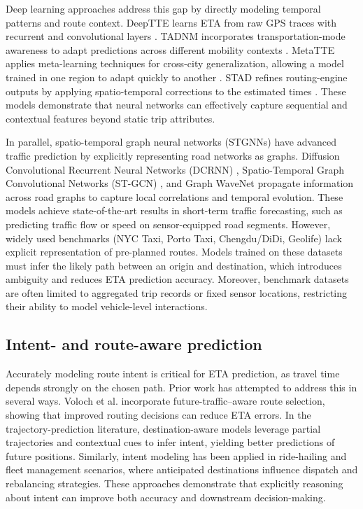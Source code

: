 Deep learning approaches address this gap by directly modeling temporal patterns and route context. DeepTTE learns ETA from raw GPS traces with recurrent and convolutional layers \cite{wang2018deeptte}. TADNM incorporates transportation-mode awareness to adapt predictions across different mobility contexts \cite{xu2020tadnm}. MetaTTE applies meta-learning techniques for cross-city generalization, allowing a model trained in one region to adapt quickly to another \cite{wang2022metatte}. STAD refines routing-engine outputs by applying spatio-temporal corrections to the estimated times \cite{abbar2020stad}. These models demonstrate that neural networks can effectively capture sequential and contextual features beyond static trip attributes.

In parallel, spatio-temporal graph neural networks (STGNNs) have advanced traffic prediction by explicitly representing road networks as graphs. Diffusion Convolutional Recurrent Neural Networks (DCRNN) \cite{li2018dcrnn}, Spatio-Temporal Graph Convolutional Networks (ST-GCN) \cite{yu2018stgcn}, and Graph WaveNet \cite{wu2019graphwavenet} propagate information across road graphs to capture local correlations and temporal evolution. These models achieve state-of-the-art results in short-term traffic forecasting, such as predicting traffic flow or speed on sensor-equipped road segments. However, widely used benchmarks (NYC Taxi, Porto Taxi, Chengdu/DiDi, Geolife) \cite{nyc_tlc,moreira2013porto,didi2016,zheng2012geolife} lack explicit representation of pre-planned routes. Models trained on these datasets must infer the likely path between an origin and destination, which introduces ambiguity and reduces ETA prediction accuracy. Moreover, benchmark datasets are often limited to aggregated trip records or fixed sensor locations, restricting their ability to model vehicle-level interactions.

\subsection{Intent- and route-aware prediction}
Accurately modeling route intent is critical for ETA prediction, as travel time depends strongly on the chosen path. Prior work has attempted to address this in several ways. Voloch et al. \cite{voloch2021} incorporate future-traffic--aware route selection, showing that improved routing decisions can reduce ETA errors. In the trajectory-prediction literature, destination-aware models leverage partial trajectories and contextual cues to infer intent, yielding better predictions of future positions. Similarly, intent modeling has been applied in ride-hailing and fleet management scenarios, where anticipated destinations influence dispatch and rebalancing strategies. These approaches demonstrate that explicitly reasoning about intent can improve both accuracy and downstream decision-making.

